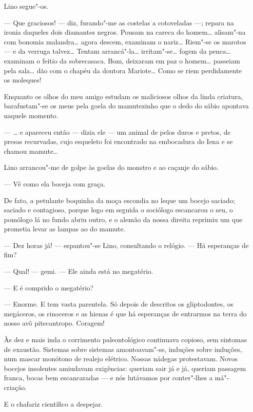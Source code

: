 Lino segue"-os.

--- Que graciosos! --- diz, furando"-me as costelas a cotoveladas ---;
repara na ironia daqueles dois diamantes negros. Pousam na careca do
homem\ldots{} alisam"-na com bonomia malandra\ldots{} agora descem, examinam o
nariz\ldots{} Riem"-se os marotos --- e da verruga talvez\ldots{} Tentam
arrancá"-la\ldots{} irritam"-se\ldots{} fogem da penca\ldots{} examinam o feitio da
sobrecasaca. Bom, deixaram em paz o homem\ldots{} passeiam pela sala\ldots{} dão
com o chapéu da doutora Mariote\ldots{} Como se riem perdidamente os
moleques!

Enquanto os olhos do meu amigo estudam os maliciosos olhos da linda
criatura, barafustam"-se os meus pela goela do mamutezinho que o dedo do
sábio apontava naquele momento.

--- \ldots{} e apareceu então --- dizia ele --- um animal de pelos duros e
pretos, de presas recurvadas, cujo esqueleto foi encontrado na
embocadura do Iena e se chamou mamute\ldots{}

Lino arrancou"-me de golpe às goelas do monstro e ao caçanje do sábio.

--- Vê como ela boceja com graça.

De fato, a petulante boquinha da moça escondia no leque um bocejo
saciado; saciado e contagioso, porque logo em seguida o sociólogo
escancarou o seu, o pomólogo lá no fundo abriu outro, e o alemão da
nossa direita reprimiu um que prometia levar as lampas ao do mamute.

--- Dez horas já! --- espantou"-se Lino, consultando o relógio. --- Há
esperanças de fim?

--- Qual! --- gemi. --- Ele ainda está no megatério.

--- E é comprido o megatério?

--- Enorme. E tem vasta parentela. Só depois de descritos os
gliptodontes, os megáceros, os rinoceros e as hienas é que há esperanças
de entrarmos na terra do nosso avô pitecantropo. Coragem!

Às dez e mais inda o corrimento paleontológico continuava copioso, sem
sintomas de exaustão. Sistemas sobre sistemas amontoavam"-se, induções
sobre induções, num mascar monótono de realejo elétrico. Nossas nádegas
protestavam. Novos bocejos insolentes amiudavam exigências: queriam sair
já e já, queriam passagem franca, bocas bem escancaradas --- e nós
lutávamos por conter"-lhes a má"-criação.

E o chafariz científico a despejar.

